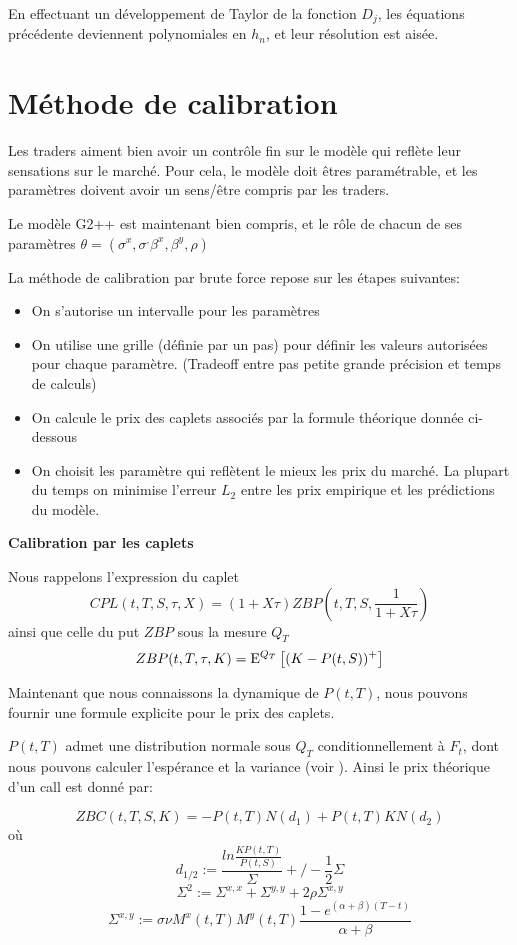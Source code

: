 En effectuant un développement de Taylor de la fonction $D_j$, les équations précédente deviennent polynomiales en $h_n$, et leur résolution est aisée.

\section{Méthode de calibration}
Les traders aiment bien avoir un contrôle fin sur le modèle qui reflète leur sensations sur le marché. Pour cela, le modèle doit êtres paramétrable, et les paramètres doivent avoir un sens/être compris par les traders.

Le modèle G2++ est maintenant bien compris, et le rôle de chacun de ses paramètres $\theta = (\sigma^x, \sigma^, \beta^x, \beta^y, \rho)$ 

La méthode de calibration par brute force repose sur les étapes suivantes:
\begin{itemize}
\item On s'autorise un intervalle pour les paramètres
\item On utilise une grille (définie par un pas) pour définir les valeurs
  autorisées pour chaque paramètre. (Tradeoff entre pas petite grande
  précision et temps de calculs)
\item On calcule le prix des caplets associés par la formule théorique donnée ci-dessous
\item On choisit les paramètre qui reflètent le mieux les prix du marché. La plupart du temps on minimise l'erreur $L_2$ entre les prix empirique et les prédictions du modèle. 
\end{itemize}

\textbf{Calibration par les caplets}

Nous rappelons l'expression du caplet 
$$CPL(t, T, S, \tau, X) = (1+X \tau) ZBP(t, T, S, \frac{1}{1+X \tau})$$
ainsi que celle du put $ZBP$ sous la mesure $Q_T$
$$ZBP(t, T, \tau, K) = \mathrm{E}^{Q_T} \left[  (K-P(t, S))^+  \right] $$

Maintenant que nous connaissons la dynamique de $P(t, T)$, nous pouvons fournir une formule explicite pour le prix des caplets.

$P(t, T)$ admet une distribution normale sous $Q_T$ conditionnellement à $F_t$,
dont nous pouvons calculer l'espérance et la variance (voir \cite{Brugo}). Ainsi le prix théorique d'un call est donné par:

$$ZBC(t, T, S, K) = -P(t, T) N( d_1 ) + P(t, T) K N(d_2)$$
où
$$d_{1/2} := \frac{ln \frac{KP(t, T)}{P(t, S)}}{\Sigma} +/- \frac{1}{2}\Sigma $$
$$\Sigma^2 := \Sigma^{x,x} + \Sigma^{y,y} + 2 \rho \Sigma^{x,y}$$
$$\Sigma^{x,y} := \sigma \nu M^x(t, T) M^y(t, T) \frac{1 - e^{(\alpha+\beta) (T-t)}}{\alpha+\beta} $$

